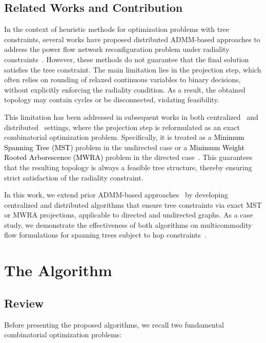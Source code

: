 \documentclass[11pt,a4paper]{article}
\theoremstyle{plain}
\theoremstyle{definition}
\theoremstyle{remark}
\newcommand{\ym}[1]{\textcolor{black}{#1}}
\begin{document}
	\subsection{Related Works and Contribution}
	In the context of heuristic methods for optimization problems with tree constraints, several works have proposed distributed ADMM-based approaches to address the power flow network reconfiguration problem under radiality constraints~\cite{shen2019distributed,nejad2020scalable-bis,lopez2023enhanced}. However, these methods do not guarantee that the final solution satisfies the tree constraint. The main limitation lies in the projection step, which often relies on rounding of relaxed continuous variables to binary decisions, without explicitly enforcing the radiality condition. As a result, the obtained topology may contain cycles or be disconnected, violating feasibility.
	
	This limitation has been addressed in subsequent works in both centralized~\cite{mokhtari2025alternating} and distributed~\cite{mokhtari2025distributed} settings, where the projection step is reformulated as an exact combinatorial optimization problem. Specifically, it is treated as a \ym{Minimum Spanning Tree (MST)} problem in the undirected case or a \ym{Minimum Weight Rooted Arborescence (MWRA)} problem in the directed case~\cite[Chapter~6.3]{korte2018combinatorial}. This guarantees that the resulting topology is always a feasible tree structure, thereby ensuring strict satisfaction of the radiality constraint.
	
	In this work, we extend prior ADMM-based approaches~\cite{shen2019distributed,nejad2020scalable-bis,lopez2023enhanced} by developing centralized and distributed algorithms that ensure tree constraints via exact MST or MWRA projections, applicable to directed and undirected graphs. As a case study, we demonstrate the effectiveness of both algorithms on multicommodity flow formulations for spanning trees subject to hop constraints~\cite{gouveia1996multicommodity,gouveia2003network,dahl2006formulations,magnanti1981combinatorial}.	
	
	
	
	
	
	
	\section{The Algorithm}
	
	\subsection{Review}
	Before presenting the proposed algorithms, we recall two fundamental combinatorial optimization problems:
\end{document}
